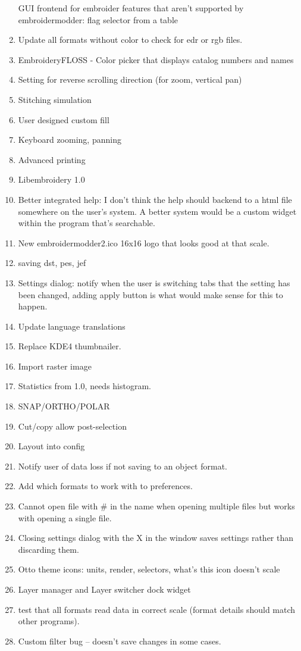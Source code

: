 \begin{enumerate}
  GUI frontend for embroider features that aren't supported by
  embroidermodder: flag selector from a table
\item
  Update all formats without color to check for edr or rgb files.
\item
  EmbroideryFLOSS - Color picker that displays catalog numbers and names
\item
  Setting for reverse scrolling direction (for zoom, vertical pan)
\item
  Stitching simulation
\item
  User designed custom fill
\item
  Keyboard zooming, panning
\item
  Advanced printing
\item
  Libembroidery 1.0
\item
  Better integrated help: I don't think the help should backend to a
  html file somewhere on the user's system. A better system would be a
  custom widget within the program that's searchable.
\item
  New embroidermodder2.ico 16x16 logo that looks good at that scale.
\item
  saving dst, pes, jef
\item
  Settings dialog: notify when the user is switching tabs that the
  setting has been changed, adding apply button is what would make sense
  for this to happen.
\item
  Update language translations
\item
  Replace KDE4 thumbnailer.
\item
  Import raster image
\item
  Statistics from 1.0, needs histogram.
\item
  SNAP/ORTHO/POLAR
\item
  Cut/copy allow post-selection
\item
  Layout into config
\item
  Notify user of data loss if not saving to an object format.
\item
  Add which formats to work with to preferences.
\item
  Cannot open file with \# in the name when opening multiple files but
  works with opening a single file.
\item
  Closing settings dialog with the X in the window saves settings rather
  than discarding them.
\item
  Otto theme icons: units, render, selectors, what's this icon doesn't
  scale
\item
  Layer manager and Layer switcher dock widget
\item
  test that all formats read data in correct scale (format details
  should match other programs).
\item
  Custom filter bug -- doesn't save changes in some cases.
\end{enumerate}

